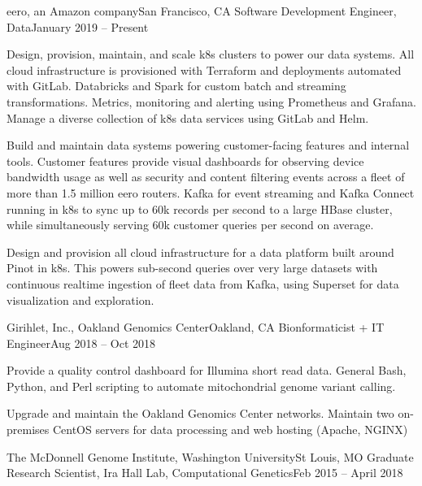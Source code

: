 \resumeSubheading
{eero, an Amazon company}{San Francisco, CA}
{Software Development Engineer, Data}{January 2019 -- Present}

\resumeItemListStart

{Design, provision, maintain, and scale k8s clusters to power our data systems. All cloud infrastructure is provisioned with Terraform and deployments automated with GitLab. Databricks and Spark for custom batch and streaming transformations. Metrics, monitoring and alerting using Prometheus and Grafana. Manage a diverse collection of k8s data services using GitLab and Helm.}

{Build and maintain data systems powering customer-facing features and internal tools. Customer features provide visual dashboards for observing device bandwidth usage as well as security and content filtering events across a fleet of more than 1.5 million eero routers. Kafka for event streaming and Kafka Connect running in k8s to sync up to 60k records per second to a large HBase cluster, while simultaneously serving 60k customer queries per second on average.}

{Design and provision all cloud infrastructure for a data platform built around Pinot in k8s. This powers sub-second queries over very large datasets with continuous realtime ingestion of fleet data from Kafka, using Superset for data visualization and exploration.}

\resumeItemListEnd


\resumeSubheading
{Girihlet, Inc., Oakland Genomics Center}{Oakland, CA}
{Bionformaticist + IT Engineer}{Aug 2018 -- Oct 2018}

\resumeItemListStart

{Provide a quality control dashboard for Illumina short read data. General Bash, Python, and Perl scripting to automate mitochondrial genome variant calling.}

{Upgrade and maintain the Oakland Genomics Center networks. Maintain two on-premises CentOS servers for data processing and web hosting (Apache, NGINX)}

\resumeItemListEnd


\resumeSubheading
{The McDonnell Genome Institute, Washington University}{St Louis, MO}
{Graduate Research Scientist, Ira Hall Lab, Computational Genetics}{Feb 2015 -- April 2018}

\resumeItemListStart

